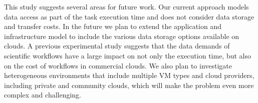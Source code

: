 \documentclass[conference]{IEEEtran}
\begin{document}

This study suggests several areas for future work. Our current approach models data access as part of the task execution time and does not consider data storage and transfer costs. In the future we plan to extend the application and infrastructure model to  include the various data storage options available on clouds. A previous experimental study \cite{Juve2010} suggests that the data demands of scientific workflows have a large impact on not only the execution time, but also on the cost of workflows in commercial clouds. We also plan to investigate heterogeneous environments that include multiple VM types and cloud providers, including private and community clouds, which will make the problem even more complex and challenging.





%







\end{document}
